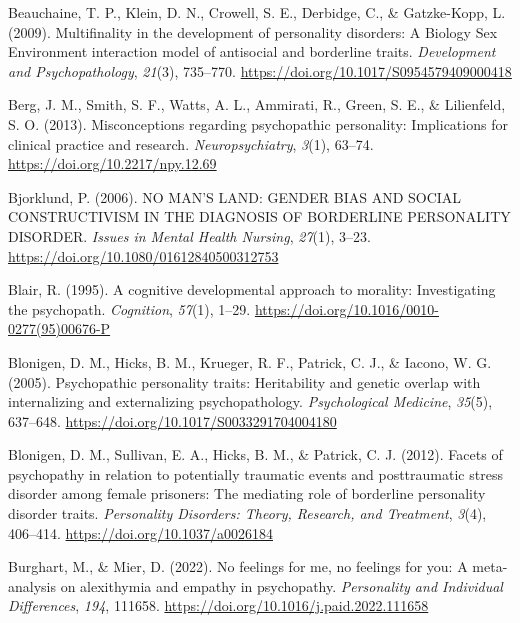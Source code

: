 \documentclass[
  man,floatsintext]{apa7}
\newlength{\cslhangindent}
\newlength{\cslentryspacingunit} %
\newenvironment{CSLReferences}[2] %
 {%
  \setlength{\parindent}{0pt}
  \ifodd #1
  \let\oldpar\par
  \def\par{\hangindent=\cslhangindent\oldpar}
  \fi
  \setlength{\parskip}{#2\cslentryspacingunit}
 }%
 {}
\begin{document}
\begin{CSLReferences}{1}{0}
\leavevmode{}%
Beauchaine, T. P., Klein, D. N., Crowell, S. E., Derbidge, C., \& Gatzke-Kopp, L. (2009). Multifinality in the development of personality disorders: {A Biology} {\texttimes} {Sex} {\texttimes} {Environment} interaction model of antisocial and borderline traits. \emph{Development and Psychopathology}, \emph{21}(3), 735--770. \url{https://doi.org/10.1017/S0954579409000418}

\leavevmode{}%
Berg, J. M., Smith, S. F., Watts, A. L., Ammirati, R., Green, S. E., \& Lilienfeld, S. O. (2013). Misconceptions regarding psychopathic personality: Implications for clinical practice and research. \emph{Neuropsychiatry}, \emph{3}(1), 63--74. \url{https://doi.org/10.2217/npy.12.69}

\leavevmode{}%
Bjorklund, P. (2006). {NO MAN}'{S LAND}: {GENDER BIAS AND SOCIAL CONSTRUCTIVISM IN THE DIAGNOSIS OF BORDERLINE PERSONALITY DISORDER}. \emph{Issues in Mental Health Nursing}, \emph{27}(1), 3--23. \url{https://doi.org/10.1080/01612840500312753}

\leavevmode{}%
Blair, R. (1995). A cognitive developmental approach to morality: Investigating the psychopath. \emph{Cognition}, \emph{57}(1), 1--29. \url{https://doi.org/10.1016/0010-0277(95)00676-P}

\leavevmode{}%
Blonigen, D. M., Hicks, B. M., Krueger, R. F., Patrick, C. J., \& Iacono, W. G. (2005). Psychopathic personality traits: Heritability and genetic overlap with internalizing and externalizing psychopathology. \emph{Psychological Medicine}, \emph{35}(5), 637--648. \url{https://doi.org/10.1017/S0033291704004180}

\leavevmode{}%
Blonigen, D. M., Sullivan, E. A., Hicks, B. M., \& Patrick, C. J. (2012). Facets of psychopathy in relation to potentially traumatic events and posttraumatic stress disorder among female prisoners: {The} mediating role of borderline personality disorder traits. \emph{Personality Disorders: Theory, Research, and Treatment}, \emph{3}(4), 406--414. \url{https://doi.org/10.1037/a0026184}

\leavevmode{}%
Burghart, M., \& Mier, D. (2022). No feelings for me, no feelings for you: {A} meta-analysis on alexithymia and empathy in psychopathy. \emph{Personality and Individual Differences}, \emph{194}, 111658. \url{https://doi.org/10.1016/j.paid.2022.111658}


\end{CSLReferences}
\end{document}
